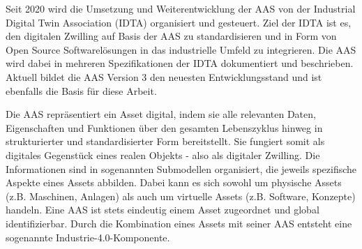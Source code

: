 Seit 2020 wird die Umsetzung und Weiterentwicklung der AAS von der Industrial Digital Twin Association (IDTA) organisiert und gesteuert.
Ziel der IDTA ist es, den digitalen Zwilling auf Basis der AAS zu standardisieren und in Form von Open Source Softwarelösungen in das industrielle Umfeld zu integrieren.
Die AAS wird dabei in mehreren Spezifikationen der IDTA dokumentiert und beschrieben.
Aktuell bildet die AAS Version 3 den neuesten Entwicklungsstand und ist ebenfalls die Basis für diese Arbeit.



Die AAS repräsentiert ein Asset digital, indem sie alle relevanten Daten, Eigenschaften und Funktionen über den gesamten Lebenszyklus hinweg in strukturierter und standardisierter Form bereitstellt. 
Sie fungiert somit als digitales Gegenstück eines realen Objekts - also als digitaler Zwilling.
Die Informationen sind in sogenannten Submodellen organisiert, die jeweils spezifische Aspekte eines Assets abbilden.
Dabei kann es sich sowohl um physische Assets (z.B. Maschinen, Anlagen) als auch um virtuelle Assets (z.B. Software, Konzepte) handeln. 
Eine AAS ist stets eindeutig einem Asset zugeordnet und global identifizierbar. 
Durch die Kombination eines Assets mit seiner AAS entsteht eine sogenannte Industrie-4.0-Komponente.

